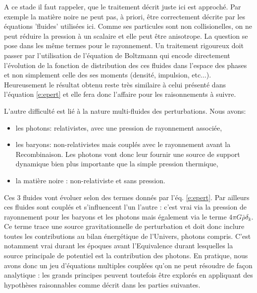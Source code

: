  A ce stade il faut rappeler, que le traitement décrit juste ici est approché. Par exemple la matière noire  ne peut pas, à priori, être correctement décrite par les équations 'fluides' utilisées ici. Comme ses particules sont non collisionelles, on ne peut réduire la pression à un scalaire et elle peut être anisotrope. La question se pose dans les même termes pour le rayonnement. Un traitement rigoureux doit passer par l'utilisation de l'équation de Boltzmann qui encode directement l'évolution de la fonction de distribution des ces fluides dans l'espace des phases et non simplement celle des ses moments (densité, impulsion, etc...).  Heureusement le résultat obtenu reste très similaire à celui présenté dans l'équation \ref{e:epert} et elle fera donc l'affaire pour les raisonnements à suivre.
 
 L'autre difficulté est lié à la nature multi-fluides des perturbations. Nous avons:
 \begin{itemize}
 \item les photons: relativistes, avec une pression de rayonnement associée,
 \item les baryons: non-relativistes mais couplés avec le rayonnement avant la Recombinaison. Les photons vont donc leur fournir une source de support dynamique bien plus importante que la simple pression thermique,
 \item la matière noire : non-relativiste et sans pression.
 \end{itemize}
 Ces 3 fluides vont évoluer selon des termes donnés par l'éq. \ref{e:epert}. Par ailleurs ces fluides sont couplés et s'influencent l'un l'autre : c'est vrai via la pression de rayonnement pour les baryons et les photons mais également via le terme $4\pi G \bar \rho \delta_k$. Ce terme trace une source gravitationnelle de perturbation et doit donc inclure toutes les contributions au bilan énergétique de l'Univers, photons compris. C'est notamment vrai durant les époques avant l'Equivalence  durant lesquelles la source principale de potentiel est la contribution des photons. En pratique, nous avons donc un jeu d'équations multiples couplées qu'on ne peut résoudre de façon analytique : les grands principes peuvent toutefois être explorés en appliquant des hypothèses raisonnables comme décrit dans les parties suivantes.
 
